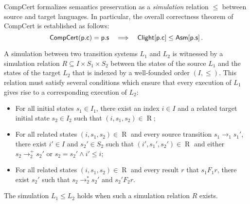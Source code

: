 CompCert formalizes semantics preservation
as a \emph{simulation} relation $\le$
between source and target languages.
In particular,
the overall correctness theorem of CompCert
is established as follows:
\begin{equation}
   \mathsf{CompCert} ( \mathsf{p.c} ) =  \mathsf{p.s} 
  \quad\Longrightarrow\quad
   \mathsf{Clight} [ \mathsf{p.c} ] \le  \mathsf{Asm} [ \mathsf{p.s} ]
  \,.
  \label{eqn:ccc-wp}
\end{equation}

A simulation between
two transition systems $L_1$ and $L_2$
is witnessed by a simulation relation
$R \subseteq I \times S_1 \times S_2$
between the states of the source $L_1$
and the states of the target $L_2$
that is indexed by a well-founded order $(I, \le)$.
This relation must satisfy several conditions
which ensure that
every execution of $L_1$ gives rise
to a corresponding execution of $L_2$:
\begin{itemize}
  \item For all initial states $s_1 \in I_1$,
    there exist an index $i\in I$
    and a related target initial state
    $s_2 \in I_2$ such that $(i, s_1, s_2) \in \mathrel{R}$;
  \item For all related states $(i, s_1, s_2) \in \mathrel{R}$
    and every source transition $s_1 \rightarrow_1 s_1'$,
    there exist $i' \in I$ and $s_2' \in S_2$
    such that $(i', s_1', s_2') \in \mathrel{R}$
    and either $s_2 \rightarrow_2^+ s_2'$
    or $s_2 = s_2' \wedge i' \le i$;
  \item For all related states $(i, s_1, s_2) \in \mathrel{R}$
    and every result $r$ that $s_1 \mathbin{F_1} r$,
    there exist $s_2'$ such that $s_2 \rightarrow_2^* s_2'$
    and $s_2' \mathbin{F_2} r$.
\end{itemize}
The simulation $L_1 \le L_2$
holds when such a simulation relation $R$ exists.

